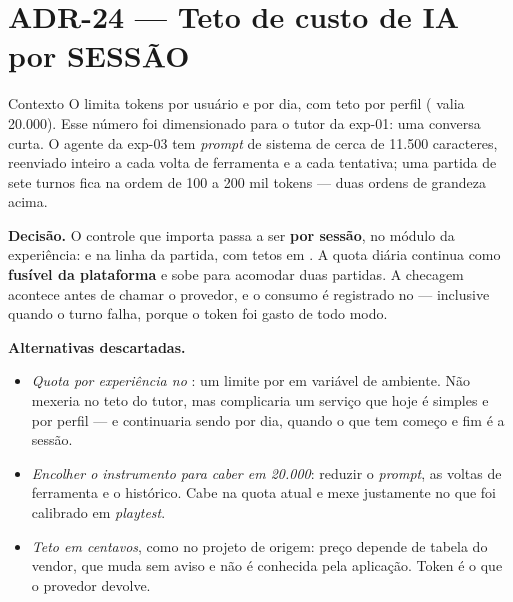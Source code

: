 \section{ADR-24 --- Teto de custo de IA por SESSÃO}
\label{adr:teto-sessao}

\begin{especificacao}{Contexto}
O  limita tokens por usuário e por dia, com teto por perfil
( valia 20.000). Esse número foi
dimensionado para o tutor da exp-01: uma conversa curta. O agente da exp-03 tem
\emph{prompt} de sistema de cerca de 11.500 caracteres, reenviado inteiro a cada
volta de ferramenta e a cada tentativa; uma partida de sete turnos fica na ordem
de 100 a 200 mil tokens --- duas ordens de grandeza acima.
\end{especificacao}

\textbf{Decisão.} O controle que importa passa a ser \textbf{por sessão}, no
módulo da experiência:  e  na linha da
partida, com tetos em . A quota diária continua como
\textbf{fusível da plataforma} e sobe para acomodar duas partidas. A checagem
acontece antes de chamar o provedor, e o consumo é registrado no  ---
inclusive quando o turno falha, porque o token foi gasto de todo modo.

\textbf{Alternativas descartadas.}
\begin{itemize}
  \item \emph{Quota por experiência no }: um limite por
     em variável de ambiente. Não mexeria no teto do tutor, mas
    complicaria um serviço que hoje é simples e por perfil --- e continuaria
    sendo por dia, quando o que tem começo e fim é a sessão.
  \item \emph{Encolher o instrumento para caber em 20.000}: reduzir o
    \emph{prompt}, as voltas de ferramenta e o histórico. Cabe na quota atual e
    mexe justamente no que foi calibrado em \emph{playtest}.
  \item \emph{Teto em centavos}, como no projeto de origem: preço depende de
    tabela do vendor, que muda sem aviso e não é conhecida pela aplicação. Token
    é o que o provedor devolve.
\end{itemize}

